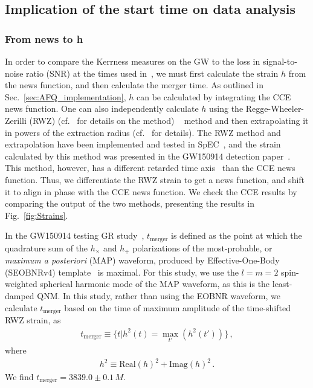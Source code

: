 \subsection{Implication of the start time on data analysis}
\label{sec:DataAnalysis}
\subsubsection{From news to h}
\label{sec:hoft}
In order to compare the Kerrness measures on the GW to the loss in signal-to-noise ratio (SNR) at the times used in~\cite{TheLIGOScientific:2016src}, we must first calculate the strain $h$ from the news function, and then calculate the merger time. As outlined in Sec.~\ref{sec:AFQ_implementation}, $h$ can be calculated by integrating the CCE news function. One can also independently calculate $h$ using the Regge-Wheeler-Zerilli (RWZ) (cf.~\cite{RZW} for details on the method) ~\cite{PhysRev.108.1063, PhysRevLett.24.737, PhysRevD.2.2141, Moncrief:1974am} method  and then extrapolating it in powers of the extraction radius (cf.~\cite{Boyle:2009vi} for details). The RWZ method and extrapolation  have been implemented and tested in SpEC~\cite{Boyle:2009vi, Taylor:2013zia}, and the strain calculated by this method was presented in the GW150914 detection paper~\cite{PhysRevLett.116.061102}. This method, however, has a different retarded time axis~\cite{Boyle:2009vi} than the CCE news function. Thus, we differentiate the RWZ strain to get a news function, and shift it to align in phase with the CCE news function. We check the CCE results by comparing the output of the two methods, presenting the results in Fig.~\ref{fig:Strains}.

In the GW150914 testing GR study~\cite{TheLIGOScientific:2016src}, $t_\mathrm{merger}$ is defined as the point at which the quadrature sum of the $h_\times$ and $h_+$ polarizations of the most-probable, or \textit{maximum a posteriori} (MAP) waveform, produced by Effective-One-Body (SEOBNRv4) template~\cite{Purrer:2015tud} is maximal. For this study, we use the $l=m=2$ spin-weighted spherical harmonic mode of the MAP waveform, as this is the least-damped QNM. In this study, rather than using the EOBNR waveform, we calculate $t_\mathrm{merger}$ based on the time of maximum amplitude of the time-shifted RWZ strain, as
\begin{align}
\label{eq:tmerger}
t_\mathrm{merger} \equiv \{t | h^2(t) = \max_{t'} (h^2(t'))\} \,,
\end{align}
where 
\begin{align}
h^2 \equiv \mathrm{Real} (h)^2 + \mathrm{Imag} (h)^2\,.
\end{align}
We find $t_\mathrm{merger} = 3839.0 \pm 0.1\,M$. 

